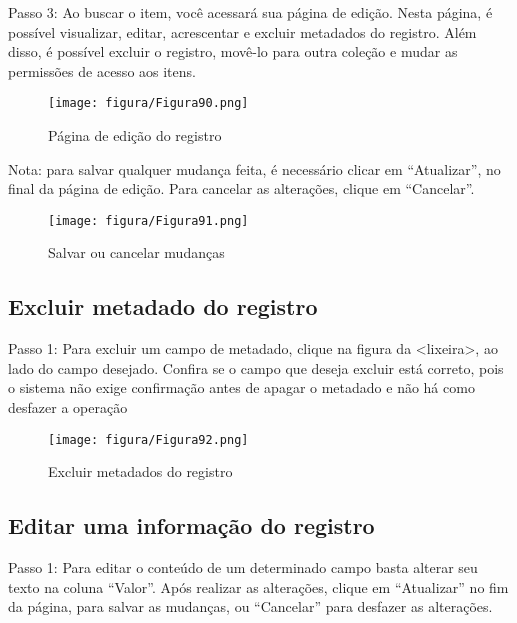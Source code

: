 \documentclass[12pt,hidelinks]{article}
\begin{document}
    \singlespacing
    
    Passo 3: Ao buscar o item, você acessará sua página de edição. Nesta página, é possível visualizar, editar, acrescentar e excluir metadados do registro. Além disso, é possível excluir o registro, movê-lo para outra coleção e mudar as permissões de acesso aos itens.
    
    \begin{figure}[!htp]
                \centering
                \texttt{[image: figura/Figura90.png]}
                \caption{Página de edição do registro}
            \label{Rotulo}
        \end{figure}
    
\newpage
    
    Nota: para salvar qualquer mudança feita, é necessário clicar em “Atualizar”, no final da página de edição. Para cancelar as alterações, clique em “Cancelar”.
    
    \begin{figure}[!htp]
                \centering
                \texttt{[image: figura/Figura91.png]}
                \caption{Salvar ou cancelar mudanças}
            \label{Rotulo}
        \end{figure}
    
    \subsection{Excluir metadado do registro}
    
    \singlespacing
    
    Passo 1: Para excluir um campo de metadado, clique na figura da <lixeira>, ao lado do campo desejado. Confira se o campo que deseja excluir está correto, pois o sistema não exige confirmação antes de apagar o metadado e não há como desfazer a operação
    
    \begin{figure}[!htp]
                \centering
                \texttt{[image: figura/Figura92.png]}
                \caption{Excluir metadados do registro}
            \label{Rotulo}
        \end{figure}
    
    \subsection{Editar uma informação do registro}
    
    Passo 1: Para editar o conteúdo de um determinado campo basta alterar seu texto na coluna “Valor”. Após realizar as alterações, clique em “Atualizar” no fim da página, para salvar as mudanças, ou “Cancelar” para desfazer as alterações.
    
\end{document}
